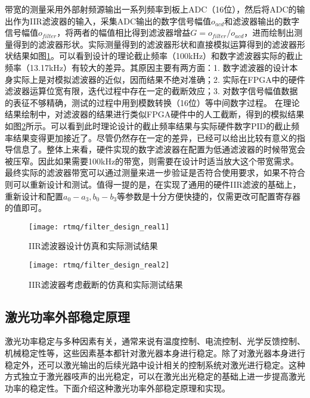 带宽的测量采用外部射频源输出一系列频率到板上ADC（16位），然后将ADC的输出作为IIR滤波器的输入，采集ADC输出的数字信号幅值$o_{acd}$和滤波器输出的数字信号幅值$o_{filter}$，将两者的幅值相比得到滤波器增益$G=o_{filter}/o_{acd}$，进而绘制出测量得到的滤波器形状。实际测量得到的滤波器形状和直接模拟运算得到的滤波器形状结果如图\ref{fig:filter_design_real1}。可以看到设计的理论截止频率（100kHz）和数字滤波器实际的截止频率（13.17kHz）有较大的差异。其原因主要有两方面：1. 数字滤波器的设计本身实际上是对模拟滤波器的近似，因而结果不绝对准确；2. 实际在FPGA中的硬件滤波器运算位宽有限，迭代过程中存在一定的截断效应；3. 对数字信号幅值数据的表征不够精确，测试的过程中用到模数转换（16位）等中间数字过程。
在理论结果绘制中，对滤波器的结果进行类似FPGA硬件中的人工截断，得到的模拟结果如图\ref{fig:filter_design_real2}所示。可以看到此时理论设计的截止频率结果与实际硬件数字PID的截止频率结果变得更加接近了。尽管仍然存在一定的差异，已经可以给出比较有意义的指导信息了。整体上来看，硬件实现的数字滤波器在配置为低通滤波器的时候带宽会被压窄。因此如果需要100kHz的带宽，则需要在设计时适当放大这个带宽需求。最终实际的滤波器带宽可以通过测量来进一步验证是否符合使用要求，如果不符合则可以重新设计和测试。值得一提的是，在实现了通用的硬件IIR滤波的基础上，重新设计和配置$a_0-a_3, b_0-b_3$等参数是十分方便快捷的，仅需更改可配置寄存器的值即可。

\begin{figure}
    \centering
    \caption[IIR滤波器设计仿真和实际测试结果]{IIR滤波器设计仿真和实际测试结果\label{fig:filter_design_real1}}
    \texttt{[image: rtmq/filter\_design\_real1]}
\end{figure}



\begin{figure}
    \centering
    \caption[IIR滤波器考虑截断的仿真和实际测试结果]{IIR滤波器考虑截断的仿真和实际测试结果\label{fig:filter_design_real2}}
    \texttt{[image: rtmq/filter\_design\_real2]}
\end{figure}

\newpage
\subsection[激光功率外部稳定原理]{激光功率外部稳定原理}
激光功率稳定与多种因素有关，通常来说有温度控制、电流控制、光学反馈控制、机械稳定性等，这些因素基本都针对激光器本身进行稳定。除了对激光器本身进行稳定外，还可以激光输出的后续光路中设计相关的控制系统对激光进行稳定。这种方式独立于激光器吱声的出光稳定，可以在激光出光稳定的基础上进一步提高激光功率的稳定性。下面介绍这种激光功率外部稳定原理和实现。

